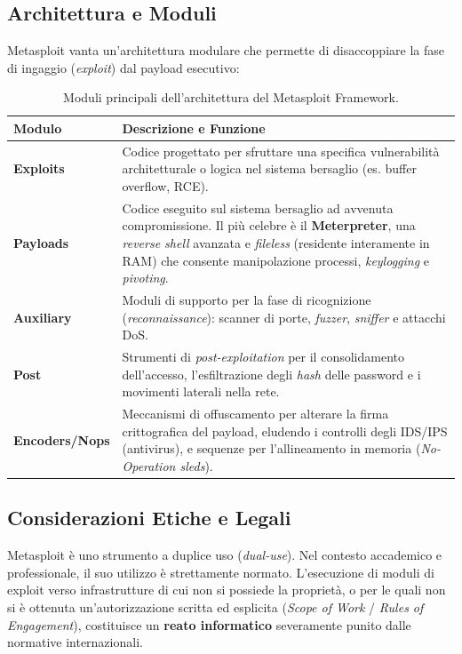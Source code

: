 \subsection{Architettura e Moduli}
Metasploit vanta un'architettura modulare che permette di disaccoppiare la fase di ingaggio (\textit{exploit}) dal payload esecutivo:

\begin{table}[htbp]
\centering
\begin{tabularx}{\textwidth}{@{}lX@{}}
\toprule
\textbf{Modulo} & \textbf{Descrizione e Funzione} \\ \midrule
\textbf{Exploits} & Codice progettato per sfruttare una specifica vulnerabilità architetturale o logica nel sistema bersaglio (es. buffer overflow, RCE). \\ \addlinespace
\textbf{Payloads} & Codice eseguito sul sistema bersaglio ad avvenuta compromissione. Il più celebre è il \textbf{Meterpreter}, una \textit{reverse shell} avanzata e \textit{fileless} (residente interamente in RAM) che consente manipolazione processi, \textit{keylogging} e \textit{pivoting}. \\ \addlinespace
\textbf{Auxiliary} & Moduli di supporto per la fase di ricognizione (\textit{reconnaissance}): scanner di porte, \textit{fuzzer}, \textit{sniffer} e attacchi DoS. \\ \addlinespace
\textbf{Post} & Strumenti di \textit{post-exploitation} per il consolidamento dell'accesso, l'esfiltrazione degli \textit{hash} delle password e i movimenti laterali nella rete. \\ \addlinespace
\textbf{Encoders/Nops} & Meccanismi di offuscamento per alterare la firma crittografica del payload, eludendo i controlli degli IDS/IPS (antivirus), e sequenze per l'allineamento in memoria (\textit{No-Operation sleds}). \\ \bottomrule
\end{tabularx}
\caption{Moduli principali dell'architettura del Metasploit Framework.}
\label{tab:metasploit_modules}
\end{table}

\subsection{Considerazioni Etiche e Legali}
Metasploit è uno strumento a duplice uso (\textit{dual-use}). Nel contesto accademico e professionale, il suo utilizzo è strettamente normato. L'esecuzione di moduli di exploit verso infrastrutture di cui non si possiede la proprietà, o per le quali non si è ottenuta un'autorizzazione scritta ed esplicita (\textit{Scope of Work} / \textit{Rules of Engagement}), costituisce un \textbf{reato informatico} severamente punito dalle normative internazionali.